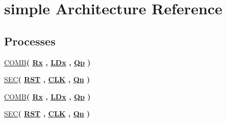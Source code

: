 \hypertarget{class_reg_ser_par_1_1simple}{}\section{simple Architecture Reference}
\label{class_reg_ser_par_1_1simple}
\subsection*{Processes}
 \begin{DoxyCompactItemize}
\item 
\hyperlink{class_reg_ser_par_1_1simple_a5a751a95b0d4554ad0182082fb6da350}{C\+O\+M\+B}{\bfseries  ( {\bfseries {\bfseries \hyperlink{class_reg_ser_par_a5b7b5dfa3fdd403b397fc3a20f75ec69}{Rx}} \textcolor{vhdlchar}{ }} , {\bfseries {\bfseries \hyperlink{class_reg_ser_par_a69819e62c0ed2812974c0d7386530300}{L\+Dx}} \textcolor{vhdlchar}{ }} , {\bfseries {\bfseries \hyperlink{class_reg_ser_par_1_1simple_a85d3dc48bd9eeb0e6c914f3706ba9015}{Qp}} \textcolor{vhdlchar}{ }} )}
\item 
\hyperlink{class_reg_ser_par_1_1simple_ab8db662ccfd43b408e594140beb223d2}{S\+E\+C}{\bfseries  ( {\bfseries {\bfseries \hyperlink{class_reg_ser_par_a98682ef7de2714e5bab788a2e2ff1b7f}{R\+S\+T}} \textcolor{vhdlchar}{ }} , {\bfseries {\bfseries \hyperlink{class_reg_ser_par_ab5d0ea9e968d49d94da9db07a979d402}{C\+L\+K}} \textcolor{vhdlchar}{ }} , {\bfseries {\bfseries \hyperlink{class_reg_ser_par_1_1simple_ad10a4e4c76feecd3a8553e7fa1d63a6f}{Qn}} \textcolor{vhdlchar}{ }} )}
\item 
\hyperlink{class_reg_ser_par_1_1simple_a5a751a95b0d4554ad0182082fb6da350}{C\+O\+M\+B}{\bfseries  ( {\bfseries {\bfseries \hyperlink{class_reg_ser_par_a5b7b5dfa3fdd403b397fc3a20f75ec69}{Rx}} \textcolor{vhdlchar}{ }} , {\bfseries {\bfseries \hyperlink{class_reg_ser_par_a69819e62c0ed2812974c0d7386530300}{L\+Dx}} \textcolor{vhdlchar}{ }} , {\bfseries {\bfseries \hyperlink{class_reg_ser_par_1_1simple_a85d3dc48bd9eeb0e6c914f3706ba9015}{Qp}} \textcolor{vhdlchar}{ }} )}
\item 
\hyperlink{class_reg_ser_par_1_1simple_ab8db662ccfd43b408e594140beb223d2}{S\+E\+C}{\bfseries  ( {\bfseries {\bfseries \hyperlink{class_reg_ser_par_a98682ef7de2714e5bab788a2e2ff1b7f}{R\+S\+T}} \textcolor{vhdlchar}{ }} , {\bfseries {\bfseries \hyperlink{class_reg_ser_par_ab5d0ea9e968d49d94da9db07a979d402}{C\+L\+K}} \textcolor{vhdlchar}{ }} , {\bfseries {\bfseries \hyperlink{class_reg_ser_par_1_1simple_ad10a4e4c76feecd3a8553e7fa1d63a6f}{Qn}} \textcolor{vhdlchar}{ }} )}
\end{DoxyCompactItemize}
